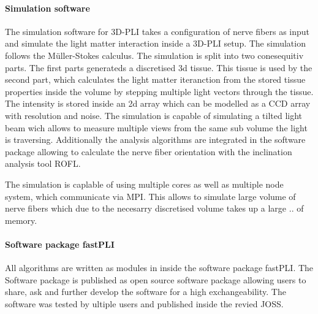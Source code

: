 \paragraph{Simulation software}
% 
The simulation software for \ac{3D-PLI} takes a configuration of nerve fibers as input and simulate the light matter interaction inside a \ac{3D-PLI} setup.
The simulation follows the M\"{u}ller-Stokes calculus.
The simulation is split into two conesequitiv parts.
The first parts generateds a discretised 3d tissue.
This tissue is used by the second part, which calculates the light matter iteranction from the stored tissue properties inside the volume by stepping multiple light vectors through the tissue.
The intensity is stored inside an 2d array which can be modelled as a \ac{CCD} array with resolution and noise.
The simulation is capable of simulating a tilted light beam wich allows to measure multiple views from the same sub volume the light is traversing.
Additionally the analysis algorithms are integrated in the software package allowing to calculate the nerve fiber orientation with the inclination analysis tool \ac{ROFL}.
\par
% 
The simulation is caplable of using multiple cores as well as multiple node system, which communicate via \ac{MPI}.
This allows to simulate large volume of nerve fibers which due to the necesarry discretised volume takes up a large .. of memory.
% 
% 
% 
\paragraph{Software package \acs{fastPLI}}
All algorithms are written as modules in \python{} inside the software package \ac{fastPLI}.
The Software package is published as open source software package allowing users to share, ask and further develop the software for a high exchangeability. 
The software was tested by ultiple users and published inside the revied \ac{JOSS}.
% 
% 
% 
